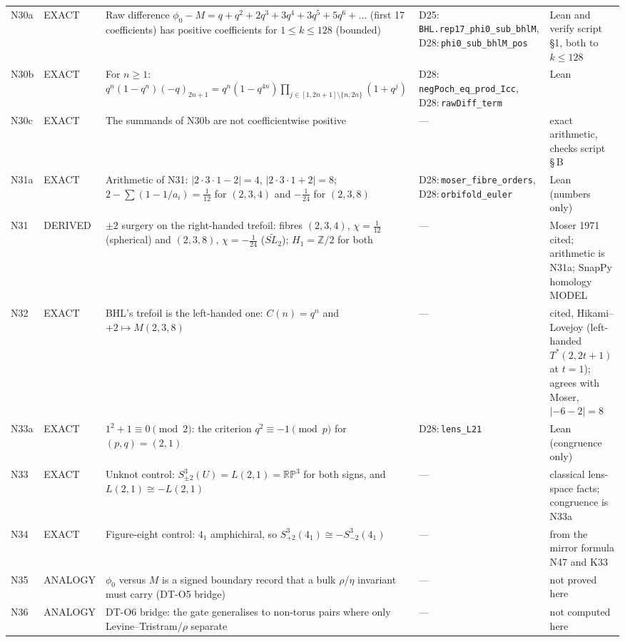 \documentclass[11pt]{article}
\theoremstyle{definition}
\newcommand{\lean}[1]{\texttt{\small #1}}
\begin{document}
{\begin{longtable}{@{}L{0.05\textwidth}L{0.12\textwidth}L{0.26\textwidth}L{0.27\textwidth}L{0.17\textwidth}@{}}
N30a & EXACT & Raw difference $\phi_0-M=q+q^2+2q^3+3q^4+3q^5+5q^6+\dots$ (first 17 coefficients) has positive coefficients for $1\le k\le128$ (bounded) & D25:\,\lean{BHL.\allowbreak{}rep17\_\allowbreak{}phi0\_\allowbreak{}sub\_\allowbreak{}bhlM}, D28:\,\lean{phi0\_\allowbreak{}sub\_\allowbreak{}bhlM\_\allowbreak{}pos} & Lean and verify script \S1, both to $k\le128$\\
N30b & EXACT & For $n\ge1$: $q^n(1-q^n)(-q)_{2n+1}=q^n(1-q^{4n})\prod_{j\in[1,2n+1]\setminus\{n,2n\}}(1+q^j)$ & D28:\,\lean{negPoch\_\allowbreak{}eq\_\allowbreak{}prod\_\allowbreak{}Icc}, D28:\,\lean{rawDiff\_\allowbreak{}term} & Lean\\
N30c & EXACT & The summands of N30b are not coefficientwise positive & --- & exact arithmetic, checks script \S\,B\\
N31a & EXACT & Arithmetic of N31: $|2\cdot3\cdot1-2|=4$, $|2\cdot3\cdot1+2|=8$; $2-\sum(1-1/a_i)=\tfrac1{12}$ for $(2,3,4)$ and $-\tfrac1{24}$ for $(2,3,8)$ & D28:\,\lean{moser\_\allowbreak{}fibre\_\allowbreak{}orders}, D28:\,\lean{orbifold\_\allowbreak{}euler} & Lean (numbers only)\\
N31 & DERIVED & $\pm2$ surgery on the right-handed trefoil: fibres $(2,3,4)$, $\chi=\tfrac1{12}$ (spherical) and $(2,3,8)$, $\chi=-\tfrac1{24}$ ($\widetilde{SL_2}$); $H_1=\mathbb Z/2$ for both & --- & Moser 1971 cited; arithmetic is N31a; SnapPy homology MODEL\\
N32 & EXACT & BHL's trefoil is the left-handed one: $C(n)=q^n$ and $+2\mapsto M(2,3,8)$ & --- & cited, Hikami--Lovejoy (left-handed $T^*(2,2t+1)$ at $t=1$); agrees with Moser, $|-6-2|=8$\\
N33a & EXACT & $1^2+1\equiv0\pmod2$: the criterion $q^2\equiv-1\pmod p$ for $(p,q)=(2,1)$ & D28:\,\lean{lens\_\allowbreak{}L21} & Lean (congruence only)\\
N33 & EXACT & Unknot control: $S^3_{\pm2}(U)=L(2,1)=\mathbb{RP}^3$ for both signs, and $L(2,1)\cong-L(2,1)$ & --- & classical lens-space facts; congruence is N33a\\
N34 & EXACT & Figure-eight control: $4_1$ amphichiral, so $S^3_{+2}(4_1)\cong-S^3_{-2}(4_1)$ & --- & from the mirror formula N47 and K33\\
N35 & ANALOGY & $\phi_0$ versus $M$ is a signed boundary record that a bulk $\rho$/$\eta$ invariant must carry (DT-O5 bridge) & --- & not proved here\\
N36 & ANALOGY & DT-O6 bridge: the gate generalises to non-torus pairs where only Levine--Tristram/$\rho$ separate & --- & not computed here\\

\end{longtable}}
\end{document}
